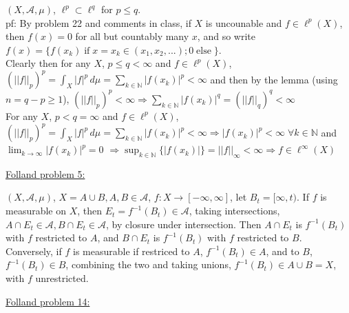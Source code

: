 \documentclass[12pt]{article}
\newcommand{\nats}[0] { \mathbb{N}}
\newcommand{\A}[0] { \mathcal{A} }
\newcommand{\IF}[0] { \; \textrm{if} \; }
\newcommand{\ELSE}[0] { \; \textrm{else} \; }
\newcommand{\rimply}[0] { \Rightarrow }
\begin{document}
\begin{flushleft}
$ (X, \A, \mu )$, $\ell^p \subset \ell^q$ for $p \le q$.\\
pf: By problem 22 and comments in class, if $X$ is uncounable and $f \in \ell^p (X)$, then $f(x) = 0$ for all but countably many $x$, and so write $f(x) = \{ f(x_k) \IF x=x_k \in (x_1, x_2, ... ); 0 \ELSE \}$. \\
Clearly then for any $X$, $p \le q < \infty $ and $ f \in \ell^p (X) $, $ (|| f ||_p)^p = \int_X |f|^p \, d\mu = \sum_{k \in \nats} |f(x_k)|^p < \infty$ and then by the lemma (using $n = q-p \ge 1$), $ (|| f ||_p)^p  < \infty \rimply \sum_{k \in \nats} |f(x_k)|^q = (|| f ||_q)^q< \infty$ \\
For any $X$, $p < q = \infty $ and $ f \in \ell^p (X) $, $ (|| f ||_p)^p = \int_X |f|^p \, d\mu = \sum_{k \in \nats} |f(x_k)|^p < \infty \rimply |f(x_k)|^p < \infty \; \forall k \in \nats  $ and $ \lim _{k \rightarrow \infty}|f(x_k)|^p = 0$  $\rimply \sup_{k \in \nats} \{ {|f(x_k)|}  \} = ||f||_\infty < \infty \rimply f \in \ell^\infty (X) $
\end{flushleft}


\begin{flushleft}
\underline{Folland problem 5:}
\end{flushleft}

\begin{flushleft}
$(X,\mathcal A, \mu )$, $X=A \cup B, A,B \in \mathcal A$, $f:X \rightarrow [-\infty,\infty]$, let $B_t = [\infty,t)$. If $f$ is measurable on $X$, then $E_t = f^{-1} (B_t) \in \mathcal A$, taking intersections, $A \cap E_t \in \mathcal A , B \cap E_t \in \mathcal A$, by closure under intersection. Then $A \cap E_t$ is $f^{-1} (B_t)$ with $f$ restricted to $A$, and $B \cap E_t$ is $f^{-1} (B_t)$ with $f$ restricted to $B$. Conversely, if $f$ is measurable if restriced to $A$, $f^{-1} (B_t) \in A$, and to $B$, $f^{-1} (B_t) \in B$, combining the two and taking unions, $f^{-1} (B_t) \in A \cup B = X$, with $f$ unrestricted.
\end{flushleft}

\begin{flushleft}
\underline{Folland problem 14:}
\end{flushleft}
\end{document}
